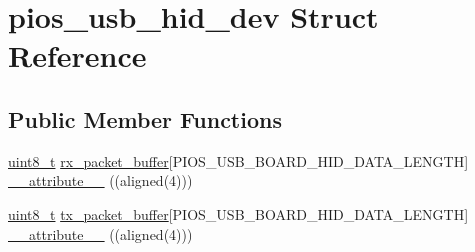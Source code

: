 \hypertarget{structpios__usb__hid__dev}{\section{pios\-\_\-usb\-\_\-hid\-\_\-dev Struct Reference}
\label{structpios__usb__hid__dev}
}
\subsection*{Public Member Functions}
\begin{DoxyCompactItemize}
\item 
\hyperlink{stdint_8h_aba7bc1797add20fe3efdf37ced1182c5}{uint8\-\_\-t} \hyperlink{group___p_i_o_s___u_s_b___h_i_d_ga20fb92cd6b239abc72cb0ac8b93b11b4}{rx\-\_\-packet\-\_\-buffer}\mbox{[}P\-I\-O\-S\-\_\-\-U\-S\-B\-\_\-\-B\-O\-A\-R\-D\-\_\-\-H\-I\-D\-\_\-\-D\-A\-T\-A\-\_\-\-L\-E\-N\-G\-T\-H\mbox{]} \hyperlink{group___p_i_o_s___u_s_b___h_i_d_ga078ed58bf52ceaf8ee4248216c518445}{\-\_\-\-\_\-attribute\-\_\-\-\_\-} ((aligned(4)))
\item 
\hyperlink{stdint_8h_aba7bc1797add20fe3efdf37ced1182c5}{uint8\-\_\-t} \hyperlink{group___p_i_o_s___u_s_b___h_i_d_gad6c7b8ecc0fe215e9d18d6d3281977c6}{tx\-\_\-packet\-\_\-buffer}\mbox{[}P\-I\-O\-S\-\_\-\-U\-S\-B\-\_\-\-B\-O\-A\-R\-D\-\_\-\-H\-I\-D\-\_\-\-D\-A\-T\-A\-\_\-\-L\-E\-N\-G\-T\-H\mbox{]} \hyperlink{structpios__usb__hid__dev_ga078ed58bf52ceaf8ee4248216c518445}{\-\_\-\-\_\-attribute\-\_\-\-\_\-} ((aligned(4)))
\end{DoxyCompactItemize}

